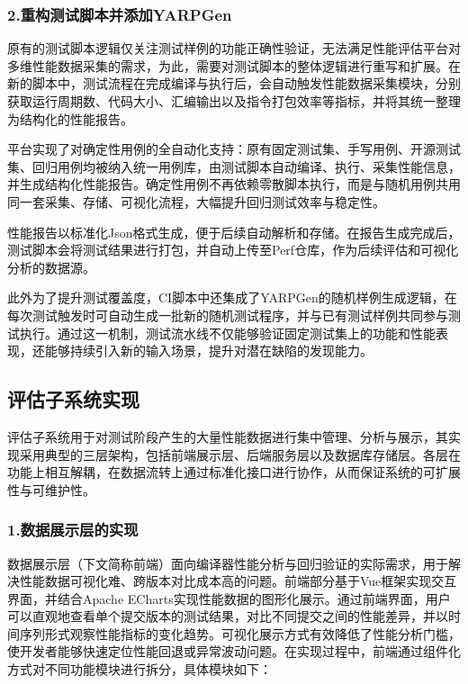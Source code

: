 \subsubsection{2.重构测试脚本并添加YARPGen}
原有的测试脚本逻辑仅关注测试样例的功能正确性验证，无法满足性能评估平台对多维性能数据采集的需求，为此，需要对测试脚本的整体逻辑进行重写和扩展。在新的脚本中，测试流程在完成编译与执行后，会自动触发性能数据采集模块，分别获取运行周期数、代码大小、汇编输出以及指令打包效率等指标，并将其统一整理为结构化的性能报告。

\par

平台实现了对确定性用例的全自动化支持：原有固定测试集、手写用例、开源测试集、回归用例均被纳入统一用例库，由测试脚本自动编译、执行、采集性能信息，并生成结构化性能报告。确定性用例不再依赖零散脚本执行，而是与随机用例共用同一套采集、存储、可视化流程，大幅提升回归测试效率与稳定性。

\par

性能报告以标准化Json格式生成，便于后续自动解析和存储。在报告生成完成后，测试脚本会将测试结果进行打包，并自动上传至Perf仓库，作为后续评估和可视化分析的数据源。

\par

此外为了提升测试覆盖度，CI脚本中还集成了YARPGen的随机样例生成逻辑，在每次测试触发时可自动生成一批新的随机测试程序，并与已有测试样例共同参与测试执行。通过这一机制，测试流水线不仅能够验证固定测试集上的功能和性能表现，还能够持续引入新的输入场景，提升对潜在缺陷的发现能力。


\subsection{评估子系统实现}
评估子系统用于对测试阶段产生的大量性能数据进行集中管理、分析与展示，其实现采用典型的三层架构，包括前端展示层、后端服务层以及数据库存储层。各层在功能上相互解耦，在数据流转上通过标准化接口进行协作，从而保证系统的可扩展性与可维护性。


\subsubsection{1.数据展示层的实现}
数据展示层（下文简称前端）面向编译器性能分析与回归验证的实际需求，用于解决性能数据可视化难、跨版本对比成本高的问题。前端部分基于Vue框架实现交互界面，并结合Apache ECharts实现性能数据的图形化展示。通过前端界面，用户可以直观地查看单个提交版本的测试结果，对比不同提交之间的性能差异，并以时间序列形式观察性能指标的变化趋势。可视化展示方式有效降低了性能分析门槛，使开发者能够快速定位性能回退或异常波动问题。在实现过程中，前端通过组件化方式对不同功能模块进行拆分，具体模块如下：

